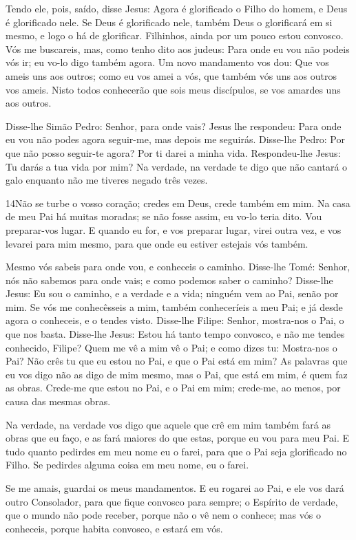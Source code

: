Tendo ele, pois, saído, disse Jesus: Agora é glorificado o Filho
do homem, e Deus é glorificado nele. Se Deus é glorificado
nele, também Deus o glorificará em si mesmo, e logo o há de
glorificar. Filhinhos, ainda por um pouco estou convosco. Vós
me buscareis, mas, como tenho dito aos judeus: Para onde eu vou não
podeis vós ir; eu vo-lo digo também agora. Um novo mandamento
vos dou: Que vos ameis uns aos outros; como eu vos amei a vós, que
também vós uns aos outros vos ameis. Nisto todos conhecerão
que sois meus discípulos, se vos amardes uns aos outros.

Disse-lhe Simão Pedro: Senhor, para onde vais? Jesus lhe
respondeu: Para onde eu vou não podes agora seguir-me, mas depois me
seguirás. Disse-lhe Pedro: Por que não posso seguir-te agora?
Por ti darei a minha vida. Respondeu-lhe Jesus: Tu darás a
tua vida por mim? Na verdade, na verdade te digo que não cantará o
galo enquanto não me tiveres negado três vezes.

\medskip

\lettrine{14} Não se turbe o vosso coração; credes em Deus,
crede também em mim. Na casa de meu Pai há muitas moradas; se
não fosse assim, eu vo-lo teria dito. Vou preparar-vos lugar. E
quando eu for, e vos preparar lugar, virei outra vez, e vos levarei
para mim mesmo, para que onde eu estiver estejais vós também.

Mesmo vós sabeis para onde vou, e conheceis o caminho.
Disse-lhe Tomé: Senhor, nós não sabemos para onde vais; e como
podemos saber o caminho? Disse-lhe Jesus: Eu sou o caminho, e a
verdade e a vida; ninguém vem ao Pai, senão por mim. Se vós me
conhecêsseis a mim, também conheceríeis a meu Pai; e já desde agora
o conheceis, e o tendes visto. Disse-lhe Filipe: Senhor,
mostra-nos o Pai, o que nos basta. Disse-lhe Jesus: Estou há
tanto tempo convosco, e não me tendes conhecido, Filipe? Quem me vê
a mim vê o Pai; e como dizes tu: Mostra-nos o Pai? Não crês
tu que eu estou no Pai, e que o Pai está em mim? As palavras que eu
vos digo não as digo de mim mesmo, mas o Pai, que está em mim, é
quem faz as obras. Crede-me que estou no Pai, e o Pai em mim;
crede-me, ao menos, por causa das mesmas obras.

Na verdade, na verdade vos digo que aquele que crê em mim também
fará as obras que eu faço, e as fará maiores do que estas, porque eu
vou para meu Pai. E tudo quanto pedirdes em meu nome eu o
farei, para que o Pai seja glorificado no Filho. Se pedirdes
alguma coisa em meu nome, eu o farei.

Se me amais, guardai os meus mandamentos. E eu rogarei ao
Pai, e ele vos dará outro Consolador, para que fique convosco para
sempre; o Espírito de verdade, que o mundo não pode receber,
porque não o vê nem o conhece; mas vós o conheceis, porque habita
convosco, e estará em vós.

